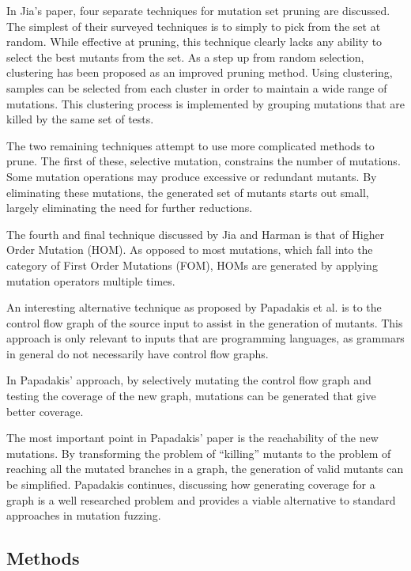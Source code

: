 In Jia's paper, four separate techniques for mutation set pruning are
discussed. The simplest of their surveyed techniques is to simply to
pick from the set at random. While effective at pruning, this
technique clearly lacks any ability to select the best mutants from
the set. As a step up from random selection, clustering has been
proposed as an improved pruning method. Using clustering, samples can
be selected from each cluster in order to maintain a wide range of
mutations. This clustering process is implemented by grouping
mutations that are killed by the same set of tests.

The two remaining techniques attempt to use more complicated methods
to prune. The first of these, selective mutation, constrains the number
of mutations. Some mutation operations may produce excessive or
redundant mutants. By eliminating these mutations, the generated set
of mutants starts out small, largely eliminating the need for further
reductions.

The fourth and final technique discussed  by Jia and Harman is that of
Higher Order Mutation (HOM). As opposed to most mutations, which fall
into the category of First Order Mutations (FOM), HOMs are generated
by applying mutation operators multiple times.

An interesting alternative technique as proposed by Papadakis et
al. is to the control flow graph of the source input to assist in the
generation of mutants. \cite{Papadakis2010} This approach is only
relevant to inputs that are programming languages, as grammars in
general do not necessarily have control flow graphs.

In Papadakis' approach, by selectively mutating the control flow graph
and testing the coverage of the new graph, mutations can be generated
that give better coverage.

The most important point in Papadakis' paper is the reachability of
the new mutations. By transforming the problem of ``killing'' mutants
to the problem of reaching all the mutated branches in a graph, the
generation of valid mutants can be simplified. Papadakis continues,
discussing how generating coverage for a graph is a well researched
problem and provides a viable alternative to standard approaches in
mutation fuzzing.





\subsection{Methods}

